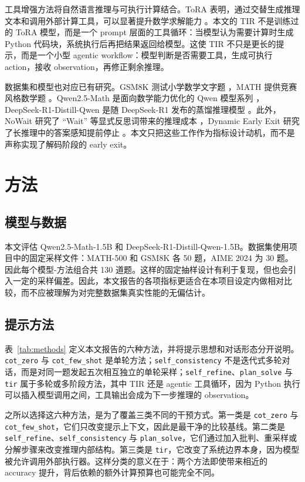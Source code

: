 \documentclass[conference]{IEEEtran}
\newcommand{\qwen}{Qwen2.5-Math-1.5B}
\newcommand{\deepseek}{DeepSeek-R1-Distill-Qwen-1.5B}
\newcommand{\mathfive}{MATH-500}
\begin{document}
工具增强方法将自然语言推理与可执行计算结合。ToRA 表明，通过交替生成推理文本和调用外部计算工具，可以显著提升数学求解能力 \cite{gou2023tora}。本文的 TIR 不是训练过的 ToRA 模型，而是一个 prompt 层面的工具循环：当模型认为需要计算时生成 Python 代码块，系统执行后再把结果返回给模型。这使 TIR 不只是更长的提示，而是一个小型 agentic workflow：模型判断是否需要工具，生成可执行 action，接收 observation，再修正剩余推理。

数据集和模型也对应已有研究。GSM8K 测试小学数学文字题 \cite{cobbe2021gsm8k}，MATH 提供竞赛风格数学题 \cite{hendrycks2021math}。Qwen2.5-Math 是面向数学能力优化的 Qwen 模型系列 \cite{yang2024qwenmath}，DeepSeek-R1-Distill-Qwen 是随 DeepSeek-R1 发布的蒸馏推理模型 \cite{deepseek2025r1}。此外，NoWait 研究了 ``Wait'' 等显式反思词带来的推理成本 \cite{wang2025nowait}，Dynamic Early Exit 研究了长推理中的答案感知提前停止 \cite{yang2025earlyexit}。本文只把这些工作作为指标设计动机，而不是声称实现了解码阶段的 early exit。

\section{方法}
\subsection{模型与数据}
本文评估 \qwen{} 和 \deepseek{}。数据集使用项目中的固定采样文件：\mathfive{} 和 GSM8K 各 50 题，AIME 2024 为 30 题。因此每个模型-方法组合共 130 道题。这样的固定抽样设计有利于复现，但也会引入一定的采样偏差。因此，本文报告的各项指标更适合在本项目设定内做相对比较，而不应被理解为对完整数据集真实性能的无偏估计。

\subsection{提示方法}
表~\ref{tab:methods} 定义本文报告的六种方法，并将提示思想和对话形态分开说明。\texttt{cot\_zero} 与 \texttt{cot\_few\_shot} 是单轮方法；\texttt{self\_consistency} 不是迭代式多轮对话，而是对同一题发起五次相互独立的单轮采样；\texttt{self\_refine}、\texttt{plan\_solve} 与 \texttt{tir} 属于多轮或多阶段方法，其中 TIR 还是 agentic 工具循环，因为 Python 执行可以插入模型调用之间，工具输出会成为下一步推理的 observation。

之所以选择这六种方法，是为了覆盖三类不同的干预方式。第一类是 \texttt{cot\_zero} 与 \texttt{cot\_few\_shot}，它们只改变提示上下文，因此是最干净的比较基线。第二类是 \texttt{self\_refine}、\texttt{self\_consistency} 与 \texttt{plan\_solve}，它们通过加入批判、重采样或分解步骤来改变推理内部结构。第三类是 \texttt{tir}，它改变了系统边界本身，因为模型被允许调用外部执行器。这样分类的意义在于：两个方法即使带来相近的 accuracy 提升，背后依赖的额外计算预算也可能完全不同。
\end{document}
